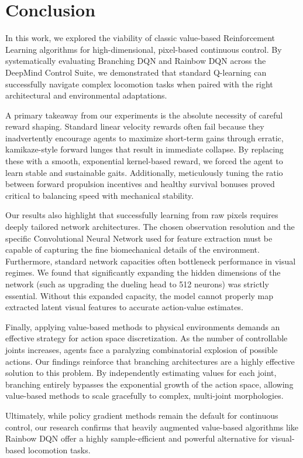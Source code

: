 \section{Conclusion}
\label{sec:conclusion}

In this work, we explored the viability of classic value-based Reinforcement Learning algorithms for high-dimensional, pixel-based continuous control. By systematically evaluating Branching DQN and Rainbow DQN across the DeepMind Control Suite, we demonstrated that standard Q-learning can successfully navigate complex locomotion tasks when paired with the right architectural and environmental adaptations.

A primary takeaway from our experiments is the absolute necessity of careful reward shaping. Standard linear velocity rewards often fail because they inadvertently encourage agents to maximize short-term gains through erratic, kamikaze-style forward lunges that result in immediate collapse. By replacing these with a smooth, exponential kernel-based reward, we forced the agent to learn stable and sustainable gaits. Additionally, meticulously tuning the ratio between forward propulsion incentives and healthy survival bonuses proved critical to balancing speed with mechanical stability.

Our results also highlight that successfully learning from raw pixels requires deeply tailored network architectures. The chosen observation resolution and the specific Convolutional Neural Network used for feature extraction must be capable of capturing the fine biomechanical details of the environment. Furthermore, standard network capacities often bottleneck performance in visual regimes. We found that significantly expanding the hidden dimensions of the network (such as upgrading the dueling head to 512 neurons) was strictly essential. Without this expanded capacity, the model cannot properly map extracted latent visual features to accurate action-value estimates.

Finally, applying value-based methods to physical environments demands an effective strategy for action space discretization. As the number of controllable joints increases, agents face a paralyzing combinatorial explosion of possible actions. Our findings reinforce that branching architectures are a highly effective solution to this problem. By independently estimating values for each joint, branching entirely bypasses the exponential growth of the action space, allowing value-based methods to scale gracefully to complex, multi-joint morphologies.

Ultimately, while policy gradient methods remain the default for continuous control, our research confirms that heavily augmented value-based algorithms like Rainbow DQN offer a highly sample-efficient and powerful alternative for visual-based locomotion tasks.